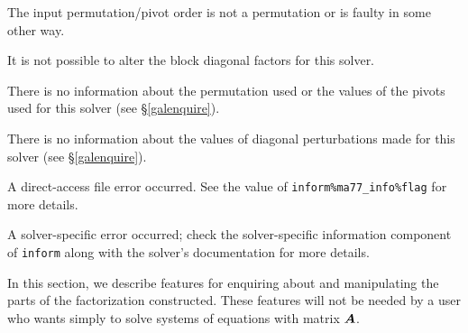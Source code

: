 \documentclass{galahad}
\begin{document}
\begin{description}
  The input permutation/pivot order is not a permutation or is
    faulty in some other way.

 It is not possible to alter the block diagonal factors for this
   solver.

 There is no information about the permutation used or the values
   of the pivots used for this solver (see \S\ref{galenquire}).

 There is no information about the values of diagonal
    perturbations made for this solver (see \S\ref{galenquire}).

 A direct-access file error occurred. See the value of
    {\tt inform\%ma77\_info\%flag} for more details.

 A solver-specific error occurred; check the solver-specific
  information component of {\tt inform} along with the solver's documentation
  for more details.

\end{description}


\galfeatures
\noindent In this section, we describe features for enquiring about and
manipulating the parts of the factorization constructed. These features
will not be needed by a user who wants simply to solve systems of
equations with matrix ${\bm{A}}$.
\end{document}
